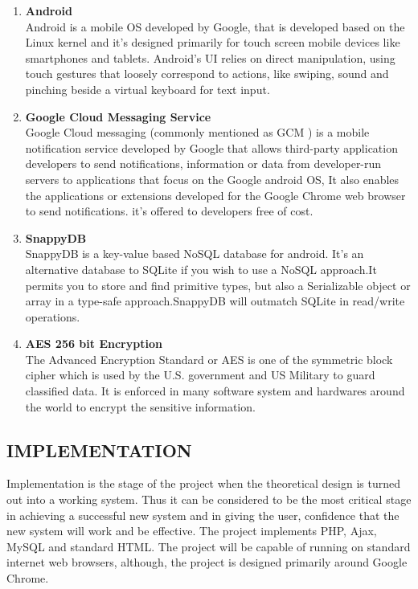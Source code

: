 \documentclass[12pt, a4paper]{article}
\begin{document}
\begin{enumerate}[leftmargin=1.5cm]
\item \textbf{Android}\\Android is a mobile OS developed by Google, that is developed based on the Linux
kernel and it's designed primarily for touch screen mobile devices like smartphones and tablets. Android’s UI relies on direct manipulation, using touch gestures that loosely correspond to  actions, like swiping, sound and pinching beside a virtual keyboard for text input. 
\item \textbf{Google Cloud Messaging Service}\\Google Cloud messaging (commonly mentioned as GCM ) is a mobile notification service developed by Google that allows third-party application developers to send notifications, information or data from developer-run servers to applications that focus on the Google android OS, It also enables the applications or extensions developed for the Google Chrome web browser to send notifications. it's offered to developers free of cost.
\item \textbf{SnappyDB}\\SnappyDB is a key-value based NoSQL database for android. It's an alternative database to  SQLite if you wish to use a NoSQL approach.It permits you to store and find primitive types, but also a Serializable object or array in a type-safe approach.SnappyDB will outmatch SQLite in read/write operations.
\item \textbf{AES 256 bit Encryption}\\The Advanced Encryption Standard or AES is one of the symmetric block cipher which is used by the U.S. government and US Military to guard classified data. It is enforced in many software system and hardwares around the world to encrypt the  sensitive information.
\end{enumerate}
\newpage
\begin{center}
\section{IMPLEMENTATION}
\end{center} 
Implementation is the stage of the project when the theoretical design is turned out into a working system. Thus it can be considered to be the most critical stage in achieving a successful new system and in giving the user, confidence that the new system will work and be effective.
The project implements PHP, Ajax, MySQL and standard HTML. The project will be capable of running on standard internet web browsers, although, the project is designed primarily around Google Chrome.
\end{document}
